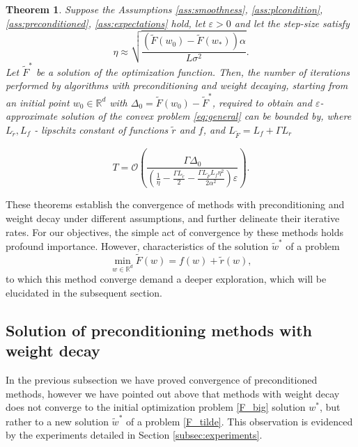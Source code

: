 \documentclass[USenglish]{article}
\theoremstyle{dgthm}
\newtheorem{theorem}{Theorem}
\theoremstyle{dgdef}
\begin{document}
\begin{theorem}
    Suppose the Assumptions \ref{ass:smoothness}, \ref{ass:plcondition}, \ref{ass:preconditioned}, \ref{ass:expectations} hold, let $\varepsilon > 0$ and let the step-size satisfy
    \begin{equation*}
        \eta \approx \sqrt{\frac{\left( \tilde{F}(w_0) - \tilde{F}(w_*) \right)\alpha}{L \sigma^2}}.
    \end{equation*}
    Let $\tilde{F}^*$ be a solution of the optimization function. Then, the number of iterations performed by algorithms with preconditioning and weight decaying, starting from an initial point $w_0 \in \mathbb{R}^d$ with $\Delta_0 = \tilde{F}(w_0) - \tilde{F}^*$, required to obtain and $\varepsilon$-approximate solution of the convex problem \eqref{eq:general} can be bounded by, where $L_{\tilde{r}}, L_{f}$ - lipschitz constant of functions $\tilde{r}$ and $f$, and $L_{\tilde{F}} = L_{f} + \Gamma L_{r}$
    
    \begin{equation*}
        T =  \mathcal{O}\left( \frac{\Gamma \Delta_0}{\left(\frac{1}{\eta} - \frac{ \Gamma L_{\tilde{r}}}{2} - \frac{\Gamma L_{\tilde{F} }L_{f}\eta^2}{2\alpha^2} \right) \varepsilon} \right).
\end{equation*}
    \label{theor:3}
\end{theorem}

These theorems establish the convergence of methods with preconditioning and weight decay under different assumptions, and further delineate their iterative rates. For our objectives, the simple act of convergence by these methods holds profound importance. 
However, characteristics of the solution $\widetilde{w}^*$  of a problem
\begin{equation} \label{F_tilde}
	\min_{w \in \mathbb{R}^d} \tilde{F}(w) = f(w) + \tilde{r}(w),
\end{equation}
to which this method converge demand a deeper exploration, which will be elucidated in the subsequent section.

\subsection{Solution of preconditioning methods with weight decay} 

 In the previous subsection we have proved convergence of preconditioned methods, however we have pointed out above that methods with weight decay does not converge to the initial optimization problem \eqref{F_big} solution $w^*$, but rather to a new solution $\widetilde{w}^*$ of a problem \eqref{F_tilde}. This observation is evidenced by the experiments detailed in Section \ref{subsec:experiments}.
\end{document}
